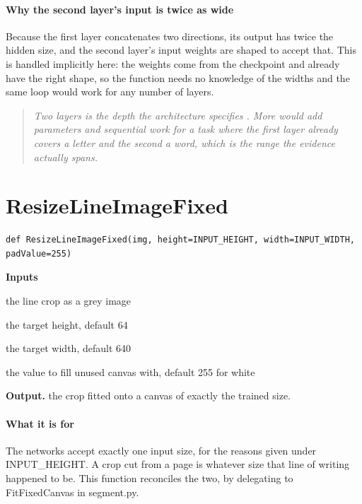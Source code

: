 \paragraph{Why the second layer's input is twice as wide}
Because the first layer concatenates two directions, its output has twice the hidden size, and the second layer's input weights are shaped to accept that. This is handled implicitly here: the weights come from the checkpoint and already have the right shape, so the function needs no knowledge of the widths and the same loop would work for any number of layers.


\begin{quote}\small\itshape Two layers is the depth the architecture specifies \cite{shi2017}. More would add parameters and sequential work for a task where the first layer already covers a letter and the second a word, which is the range the evidence actually spans.\end{quote}

\section{ResizeLineImageFixed}
\begin{lstlisting}[style=sig]
def ResizeLineImageFixed(img, height=INPUT_HEIGHT, width=INPUT_WIDTH, padValue=255)
\end{lstlisting}

\noindent\textbf{Inputs}
\begin{description}[leftmargin=2.2em,style=nextline,font=\normalfont\ttfamily]\setlength\itemsep{1pt}
  \item[{img}] \normalfont the line crop as a grey image
  \item[{height}] \normalfont the target height, default 64
  \item[{width}] \normalfont the target width, default 640
  \item[{padValue}] \normalfont the value to fill unused canvas with, default 255 for white
\end{description}

\noindent\textbf{Output.} the crop fitted onto a canvas of exactly the trained size.


\paragraph{What it is for}
The networks accept exactly one input size, for the reasons given under INPUT\_HEIGHT. A crop cut from a page is whatever size that line of writing happened to be. This function reconciles the two, by delegating to FitFixedCanvas in segment.py.


